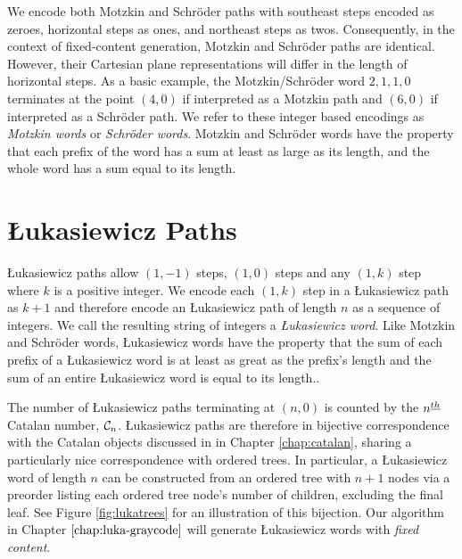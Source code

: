 We encode both Motzkin and Schröder paths with southeast steps encoded as zeroes, horizontal steps as ones, and northeast steps as twos.
Consequently, in the context of fixed-content generation, Motzkin and Schröder paths are identical.  However, their Cartesian plane representations will differ in the length of horizontal steps. As a basic example, the Motzkin/Schröder word $2,1,1,0$ terminates at the point $(4,0)$ if interpreted as a Motzkin path and $(6,0)$ if interpreted as a Schröder path.  We refer to these integer based encodings as \emph{Motzkin words} or \emph{Schröder words}.  Motzkin and Schröder words have the property that each prefix of the word has a sum at least as large as its length, and the whole word has a sum equal to its length.



\section{Łukasiewicz Paths}\label{sec:lukasiewicz}

Łukasiewicz paths allow $(1,-1)$ steps, $(1,0)$ steps and any $(1,k)$ step where $k$ is a positive integer. We encode each $(1,k)$ step in a Łukasiewicz path as $k+1$ and therefore encode an Łukasiewicz path of length $n$ as a sequence of integers.  We call the resulting string of integers a \emph{Łukasiewicz word}.  Like Motzkin and Schröder words, Łukasiewicz words have the property that the sum of each prefix of a Łukasiewicz word is at least as great as the prefix's length and the sum of an entire Łukasiewicz word is equal to its length.. 

The number of Łukasiewicz paths terminating at $(n,0)$ is counted by the $n^{\underline{th}}$ Catalan number, $\mathcal{C}_n$. Łukasiewicz paths are therefore in bijective correspondence with the Catalan objects discussed in in Chapter \ref{chap:catalan}, sharing a particularly nice correspondence with ordered trees. In particular, a Łukasiewicz word of length $n$ can be constructed from an ordered tree with $n+1$ nodes via a preorder listing each ordered tree node's number of children, excluding the final leaf.  See Figure \ref{fig:lukatrees} for an illustration of this bijection.
Our algorithm in Chapter $\ref{chap:luka-graycode}$ will generate Łukasiewicz words with \emph{fixed content}.


